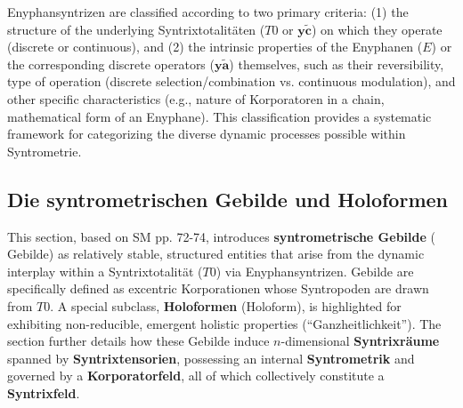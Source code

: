 \documentclass[12pt]{article}
\newcommand{\q}[1]{\enquote{#1}}
\newcommand{\syntrixtotalitaet}{T0}
\newcommand{\diskreteEnyphansyntrix}{\bm{y\widetilde{a}}}
\newcommand{\enyphane}{E}
\newcommand{\syntrometrischesGebilde}{\text{Gebilde}}
\newcommand{\holoform}{\text{Holoform}}
\begin{document}
Enyphansyntrizen are classified according to two primary criteria: (1) the structure of the underlying Syntrixtotalitäten (\(\syntrixtotalitaet\) or \(\mathbf{y\widetilde{c}}\)) on which they operate (discrete or continuous), and (2) the intrinsic properties of the Enyphanen (\(\enyphane\)) or the corresponding discrete operators (\(\diskreteEnyphansyntrix\)) themselves, such as their reversibility, type of operation (discrete selection/combination vs. continuous modulation), and other specific characteristics (e.g., nature of Korporatoren in a chain, mathematical form of an Enyphane). This classification provides a systematic framework for categorizing the diverse dynamic processes possible within Syntrometrie.

\subsection{Die syntrometrischen Gebilde und Holoformen}
\label{sec:gebilde}

This section, based on SM pp. 72-74, introduces \textbf{syntrometrische Gebilde} (\(\syntrometrischesGebilde\)) as relatively stable, structured entities that arise from the dynamic interplay within a Syntrixtotalität (\(\syntrixtotalitaet\)) via Enyphansyntrizen. Gebilde are specifically defined as excentric Korporationen whose Syntropoden are drawn from \( \syntrixtotalitaet \). A special subclass, \textbf{Holoformen} (\(\holoform\)), is highlighted for exhibiting non-reducible, emergent holistic properties (\q{Ganzheitlichkeit}). The section further details how these Gebilde induce \(n\)-dimensional \textbf{Syntrixräume} spanned by \textbf{Syntrixtensorien}, possessing an internal \textbf{Syntrometrik} and governed by a \textbf{Korporatorfeld}, all of which collectively constitute a \textbf{Syntrixfeld}.
\end{document}
